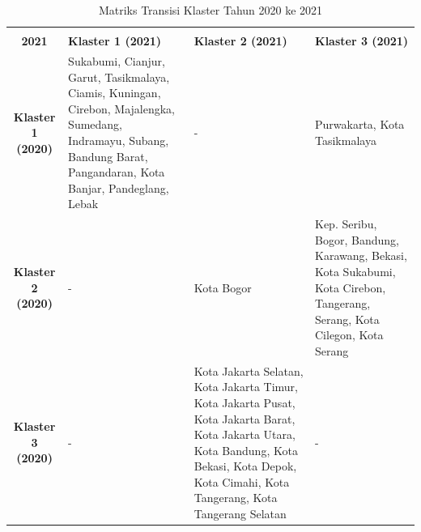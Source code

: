 \begin{table}[H]
\centering
\caption{Matriks Transisi Klaster Tahun 2020 ke 2021} \label{tab:transisi_2020_2021}
\begin{tabular}{|c|p{2cm}|p{2cm}|p{2cm}|}
\hline
\makecell{\textbf{Tahun 2020} \\ \textbf{2021}} & \textbf{Klaster 1 (2021)} & \textbf{Klaster 2 (2021)} & \textbf{Klaster 3 (2021)} \\ \hline
\textbf{Klaster 1 (2020)} & Sukabumi, Cianjur, Garut, Tasikmalaya, Ciamis, Kuningan, Cirebon, Majalengka, Sumedang, Indramayu, Subang, Bandung Barat, Pangandaran, Kota Banjar, Pandeglang, Lebak & - & Purwakarta, Kota Tasikmalaya \\ \hline
\textbf{Klaster 2 (2020)} & - & Kota Bogor & Kep. Seribu, Bogor, Bandung, Karawang, Bekasi, Kota Sukabumi, Kota Cirebon, Tangerang, Serang, Kota Cilegon, Kota Serang \\ \hline
\textbf{Klaster 3 (2020)} & - & Kota Jakarta Selatan, Kota Jakarta Timur, Kota Jakarta Pusat, Kota Jakarta Barat, Kota Jakarta Utara, Kota Bandung, Kota Bekasi, Kota Depok, Kota Cimahi, Kota Tangerang, Kota Tangerang Selatan & - \\ \hline
\end{tabular}
\end{table}